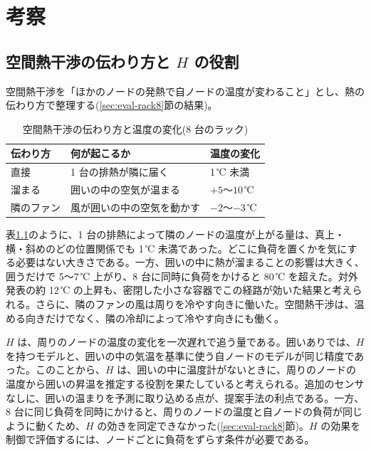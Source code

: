 \chapter{考察}\label{chap:discussion}

\section{空間熱干渉の伝わり方と $H$ の役割}\label{sec:disc-paths}
空間熱干渉を「ほかのノードの発熱で自ノードの温度が変わること」とし、熱の伝わり方で整理する(\ref{sec:eval-rack8}節の結果)。

\begin{table}[tb]
  \centering
  \caption{空間熱干渉の伝わり方と温度の変化(8 台のラック)}
  \label{tab:disc-paths}
  \begin{tabular}{lll}
    \toprule
    伝わり方 & 何が起こるか & 温度の変化 \\
    \midrule
    直接 & 1 台の排熱が隣に届く & 1\,℃ 未満 \\
    溜まる & 囲いの中の空気が温まる & $+5$〜$10$\,℃ \\
    隣のファン & 風が囲いの中の空気を動かす & $-2$〜$-3$\,℃ \\
    \bottomrule
  \end{tabular}
\end{table}

表\ref{tab:disc-paths}のように、1 台の排熱によって隣のノードの温度が上がる量は、真上・横・斜めのどの位置関係でも 1\,℃ 未満であった。どこに負荷を置くかを気にする必要はない大きさである。一方、囲いの中に熱が溜まることの影響は大きく、囲うだけで 5〜7\,℃ 上がり、8 台に同時に負荷をかけると 80\,℃ を超えた。対外発表の約 12\,℃ の上昇も、密閉した小さな容器でこの経路が効いた結果と考えられる。さらに、隣のファンの風は周りを冷やす向きに働いた。空間熱干渉は、温める向きだけでなく、隣の冷却によって冷やす向きにも働く。

$H$ は、周りのノードの温度の変化を一次遅れで追う量である。囲いありでは、$H$ を持つモデルと、囲いの中の気温を基準に使う自ノードのモデルが同じ精度であった。このことから、$H$ は、囲いの中に温度計がないときに、周りのノードの温度から囲いの昇温を推定する役割を果たしていると考えられる。追加のセンサなしに、囲いの温まりを予測に取り込める点が、提案手法の利点である。一方、8 台に同じ負荷を同時にかけると、周りのノードの温度と自ノードの負荷が同じように動くため、$H$ の効きを同定できなかった(\ref{sec:eval-rack8}節)。$H$ の効果を制御で評価するには、ノードごとに負荷をずらす条件が必要である。

